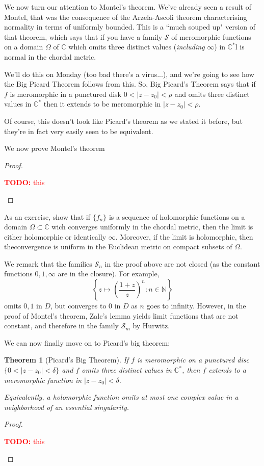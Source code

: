 \documentclass{article}
\newtheorem{theorem}{Theorem}
\newcommand{\mbb}[1]{\mathbb{#1}}
\newcommand{\mc}[1]{\mathcal{#1}}
\newcommand{\TODO}[1]{\begin{center}\huge{\textcolor{red}{\textbf{TODO:} #1}}\end{center}}
\begin{document}
We now turn our attention to Montel's theorem. We've already seen a result of Montel, that was the consequence of the Arzela-Ascoli theorem characterising normality in terms of uniformly bounded. This is a ``much souped up" version of that theorem, which says that if you have a family \(\mc{S}\) of meromorphic functions on a domain \(\Omega\) of \(\mbb{C}\) which omits three distinct values (\textit{including} \(\infty\)) in \(\mbb{C}^*\)l is normal in the chordal metric.

We'll do this on Monday (too bad there's a virus...), and we're going to see how the Big Picard Theorem follows from this. So, Big Picard's Theorem says that if \(f\) is meromorphic in a punctured disk \(0 < |z - z_0| < \rho\) and omits three distinct values in \(\mbb{C}^*\) then it extends to be meromorphic in \(|z - z_0| < \rho\).

Of course, this doesn't look like Picard's theorem as we stated it before, but they're in fact very easily seen to be equivalent.

We now prove Montel's theorem
\begin{proof}
\TODO{this}
\end{proof}

As an exercise, show that if \(\{f_n\}\) is a sequence of holomorphic functions on a domain \(\Omega \subset \mbb{C}\) wich converges uniformly in the chordal metric, then the limit is either holomorphic or identically \(\infty\). Moreover, if the limit is holomorphic, then theconvergence is uniform in the Euclidean metric on compact subsets of \(\Omega\).

We remark that the families \(\mc{S}_n\) in the proof above are not closed (as the constant functions \(0, 1, \infty\) are in the closure). For example,
\begin{equation}\left\{z \mapsto \left(\frac{1 + z}{z}\right)^n : n \in \mbb{N}\right\}\end{equation}
omits \(0, 1\) in \(D\), but converges to \(0\) in \(D\) as \(n\) goes to infinity. However, in the proof of Montel's theorem, Zalc's lemma yields limit functions that are not constant, and therefore in the family \(\mc{S}_m\) by Hurwitz.

We can now finally move on to Picard's big theorem:
\begin{theorem}[Picard's Big Theorem]
If \(f\) is meromorphic on a punctured disc \(\{0 < |z - z_0| < \delta\}\) and \(f\) omits three distinct values in \(\mbb{C}^*\), then \(f\) extends to a meromorphic function in \(|z - z_0| < \delta\).

Equivalently, a holomorphic function omits at most one complex value in a neighborhood of an essential singularity.
\end{theorem}
\begin{proof}
\TODO{this}
\end{proof}
\end{document}
